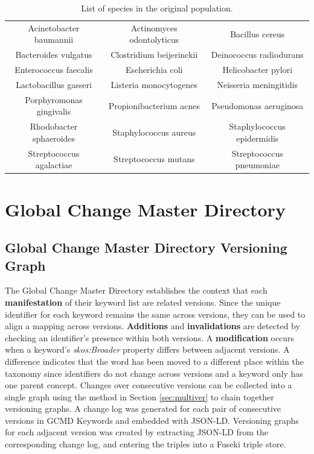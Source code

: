 \begin{table}
	\caption{List of species in the original population.}
	\label{species_table}
	\centering
	\setlength{\tabcolsep}{2pt}
	\begin{tabular}{|c|c|c|}
		\hline
		Acinetobacter baumannii & Actinomyces odontolyticus & Bacillus cereus \\
		Bacteroides vulgatus & Clostridium beijerinckii & Deinococcus radiodurans \\
		Enterococcus faecalis & Escherichia coli & Helicobacter pylori \\
		Lactobacillus gasseri & Listeria monocytogenes & Neisseria meningitidis\\
		Porphyromonas gingivalis & Propionibacterium acnes & Pseudomonas aeruginosa \\
		Rhodobacter sphaeroides & Staphylococcus aureus & Staphylococcus epidermidis\\
		Streptococcus agalactiae & Streptococcus mutans & Streptococcus pneumoniae \\
		\hline
	\end{tabular}
\end{table}

\section{Global Change Master Directory}

\subsection{Global Change Master Directory Versioning Graph}

The Global Change Master Directory establishes the context that each \textbf{manifestation} of their keyword list are related versions.
Since the unique identifier for each keyword remains the same across versions, they can be used to align a mapping across versions.
\textbf{Additions} and \textbf{invalidations} are detected by checking an identifier's presence within both versions.
A \textbf{modification} occurs when a keyword's \textit{skos:Broader} property differs between adjacent versions.
A difference indicates that the word has been moved to a different place within the taxonomy since identifiers do not change across versions and a keyword only has one parent concept.
Changes over consecutive versions can be collected into a single graph using the method in Section \ref{sec:multiver} to chain together versioning graphs.
A change log was generated for each pair of consecutive versions in GCMD Keywords and embedded with JSON-LD.
Versioning graphs for each adjacent version was created by extracting JSON-LD from the corresponding change log, and entering the triples into a Fuseki triple store.


